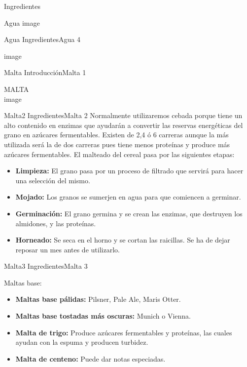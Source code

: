 \begin{frame}{Ingredientes}
\begin{block}{Agua}
{image}
\end{block}

\begin{block}{Agua}
\protect\hypertarget{agua-3}{}
IngredientesAgua 4

{image}
\end{block}

\begin{block}{Malta}
\protect\hypertarget{malta}{}
IntroducciónMalta 1

MALTA\\
{image}

\begin{block}{Malta2}
\protect\hypertarget{malta2}{}
IngredientesMalta 2 Normalmente utilizaremos cebada porque tiene un alto
contenido en enzimas que ayudarán a convertir las reservas energéticas
del grano en azúcares fermentables. Existen de 2,4 ó 6 carreras aunque
la más utilizada será la de dos carreras pues tiene menos proteínas y
produce más azúcares fermentables. El malteado del cereal pasa por las
siguientes etapas:\\

\begin{itemize}
\item
  \textbf{Limpieza:} El grano pasa por un proceso de filtrado que
  servirá para hacer una selección del mismo.
\item
  \textbf{Mojado:} Los granos se sumerjen en agua para que comiencen a
  germinar.
\item
  \textbf{Germinación:} El grano germina y se crean las enzimas, que
  destruyen los almidones, y las proteínas.
\item
  \textbf{Horneado:} Se seca en el horno y se cortan las raicillas. Se
  ha de dejar reposar un mes antes de utilizarlo.
\end{itemize}
\end{block}

\begin{block}{Malta3}
\protect\hypertarget{malta3}{}
IngredientesMalta 3

Maltas base:

\begin{itemize}
\item
  \textbf{Maltas base pálidas:} Pilsner, Pale Ale, Maris Otter.
\item
  \textbf{Maltas base tostadas más oscuras:} Munich o Vienna.
\item
  \textbf{Malta de trigo:} Produce azúcares fermentables y proteínas,
  las cuales ayudan con la espuma y producen turbidez.
\item
  \textbf{Malta de centeno:} Puede dar notas especiadas.
\end{itemize}


\end{block}
\end{block}
\end{frame}
